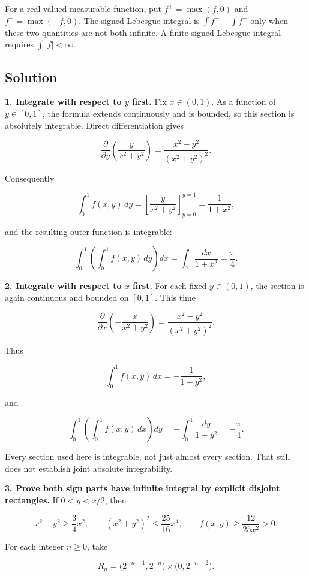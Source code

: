 \documentclass[
  11pt,
]{article}
\begin{document}
For a real-valued measurable function, put \(f^+=\max(f,0)\) and
\(f^-=\max(-f,0)\). The signed Lebesgue integral is
\(\int f^+-\int f^-\) only when these two quantities are not both
infinite. A finite signed Lebesgue integral requires \(\int|f|<\infty\).

\subsection{Solution}\label{solution-3}

\textbf{1. Integrate with respect to \(y\) first.} Fix \(x\in(0,1)\). As
a function of \(y\in[0,1]\), the formula extends continuously and is
bounded, so this section is absolutely integrable. Direct
differentiation gives

\[
\frac{\partial}{\partial y}\left(\frac{y}{x^2+y^2}\right)
=\frac{x^2-y^2}{(x^2+y^2)^2}.
\]

Consequently

\[
\int_0^1 f(x,y)\,dy
=\left[\frac{y}{x^2+y^2}\right]_{y=0}^{y=1}
=\frac1{1+x^2},
\]

and the resulting outer function is integrable:

\[
\int_0^1\left(\int_0^1f(x,y)\,dy\right)dx
=\int_0^1\frac{dx}{1+x^2}
=\boxed{\frac\pi4}.
\]

\textbf{2. Integrate with respect to \(x\) first.} For each fixed
\(y\in(0,1)\), the section is again continuous and bounded on \([0,1]\).
This time

\[
\frac{\partial}{\partial x}\left(-\frac{x}{x^2+y^2}\right)
=\frac{x^2-y^2}{(x^2+y^2)^2}.
\]

Thus

\[
\int_0^1 f(x,y)\,dx=-\frac1{1+y^2},
\]

and

\[
\int_0^1\left(\int_0^1f(x,y)\,dx\right)dy
=-\int_0^1\frac{dy}{1+y^2}
=\boxed{-\frac\pi4}.
\]

Every section used here is integrable, not just almost every section.
That still does not establish joint absolute integrability.

\textbf{3. Prove both sign parts have infinite integral by explicit
disjoint rectangles.} If \(0<y<x/2\), then

\[
x^2-y^2\geq\frac34x^2,
\qquad (x^2+y^2)^2\leq\frac{25}{16}x^4,
\qquad f(x,y)\geq\frac{12}{25x^2}>0.
\]

For each integer \(n\geq0\), take

\[
R_n=\bigl(2^{-n-1},2^{-n}\bigr)
\times\bigl(0,2^{-n-2}\bigr).
\]
\end{document}
